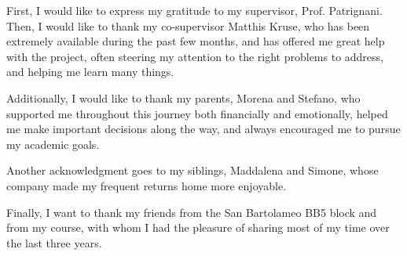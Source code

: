 
First, I would like to express my gratitude to my supervisor, Prof. Patrignani. Then, I would like to thank my co-supervisor Matthis Kruse, who has been extremely available during the past few months, and has offered me great help with the project, often steering my attention to the right problems to address, and helping me learn many things.

Additionally, I would like to thank my parents, Morena and Stefano, who supported me throughout this journey both financially and emotionally, helped me make important decisions along the way, and always encouraged me to pursue my academic goals.

Another acknowledgment goes to my siblings, Maddalena and Simone, whose company made my frequent returns home more enjoyable.

Finally, I want to thank my friends from the San Bartolameo BB5 block and from my course, with whom I had the pleasure of sharing most of my time over the last three years.